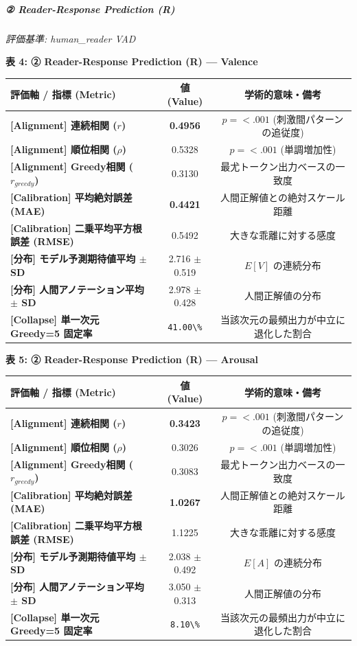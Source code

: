\subparagraph{② Reader-Response Prediction (R)}
\textit{評価基準: human\_reader VAD}

\textbf{表 4: ② Reader-Response Prediction (R) — Valence}
\begin{center}
\small
\begin{tabular}{lcc}
\toprule
\textbf{評価軸 / 指標 (Metric)} & \textbf{値 (Value)} & \textbf{学術的意味・備考} \\
\midrule
\textbf{[Alignment] 連続相関 ($r$)} & \textbf{0.4956} & $p = <.001 $ (刺激間パターンの追従度) \\
\textbf{[Alignment] 順位相関 ($\rho$)} & 0.5328 & $p = <.001 $ (単調増加性) \\
\textbf{[Alignment] Greedy相関 ($r_{greedy}$)} & 0.3130 & 最尤トークン出力ベースの一致度 \\
\textbf{[Calibration] 平均絶対誤差 (MAE)} & \textbf{0.4421} & 人間正解値との絶対スケール距離 \\
\textbf{[Calibration] 二乗平均平方根誤差 (RMSE)} & 0.5492 & 大きな乖離に対する感度 \\
\textbf{[分布] モデル予測期待値平均 $\pm$ SD} & 2.716 $\pm$ 0.519 & $E[V]$ の連続分布 \\
\textbf{[分布] 人間アノテーション平均 $\pm$ SD} & 2.978 $\pm$ 0.428 & 人間正解値の分布 \\
\textbf{[Collapse] 単一次元 Greedy=5 固定率} & \texttt{41.00\textbackslash{}\%} & 当該次元の最頻出力が中立に退化した割合 \\
\bottomrule
\end{tabular}
\end{center}


\textbf{表 5: ② Reader-Response Prediction (R) — Arousal}
\begin{center}
\small
\begin{tabular}{lcc}
\toprule
\textbf{評価軸 / 指標 (Metric)} & \textbf{値 (Value)} & \textbf{学術的意味・備考} \\
\midrule
\textbf{[Alignment] 連続相関 ($r$)} & \textbf{0.3423} & $p = <.001 $ (刺激間パターンの追従度) \\
\textbf{[Alignment] 順位相関 ($\rho$)} & 0.3026 & $p = <.001 $ (単調増加性) \\
\textbf{[Alignment] Greedy相関 ($r_{greedy}$)} & 0.3083 & 最尤トークン出力ベースの一致度 \\
\textbf{[Calibration] 平均絶対誤差 (MAE)} & \textbf{1.0267} & 人間正解値との絶対スケール距離 \\
\textbf{[Calibration] 二乗平均平方根誤差 (RMSE)} & 1.1225 & 大きな乖離に対する感度 \\
\textbf{[分布] モデル予測期待値平均 $\pm$ SD} & 2.038 $\pm$ 0.492 & $E[A]$ の連続分布 \\
\textbf{[分布] 人間アノテーション平均 $\pm$ SD} & 3.050 $\pm$ 0.313 & 人間正解値の分布 \\
\textbf{[Collapse] 単一次元 Greedy=5 固定率} & \texttt{8.10\textbackslash{}\%} & 当該次元の最頻出力が中立に退化した割合 \\
\bottomrule
\end{tabular}
\end{center}


